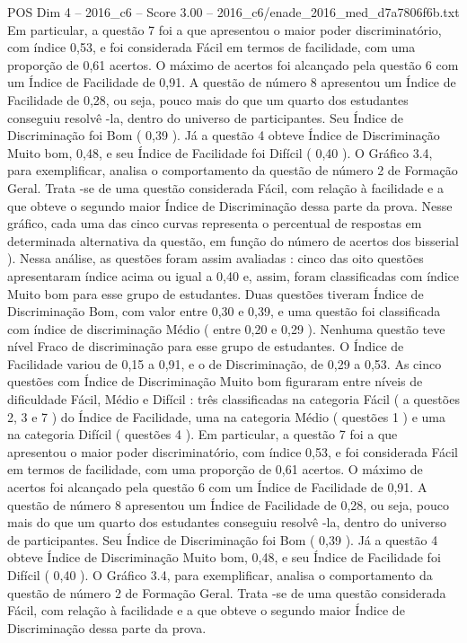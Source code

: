 \begin{textsample}{POS Dim 4 – 2016\_c6 – Score 3.00 – 2016\_c6/enade\_2016\_med\_d7a7806f6b.txt}
Em particular, a questão 7 foi a que apresentou o maior poder discriminatório, com índice 0,53, e foi considerada Fácil em termos de facilidade, com uma proporção de 0,61 acertos.
O máximo de acertos foi alcançado pela questão 6 com um Índice de Facilidade de 0,91.
A questão de número 8 apresentou um Índice de Facilidade de 0,28, ou seja, pouco mais do que um quarto dos estudantes conseguiu resolvê -la, dentro do universo de participantes.
Seu Índice de Discriminação foi Bom ( 0,39 ).
Já a questão 4 obteve Índice de Discriminação Muito bom, 0,48, e seu Índice de Facilidade foi Difícil ( 0,40 ).
O Gráfico 3.4, para exemplificar, analisa o comportamento da questão de número 2 de Formação Geral.
Trata -se de uma questão considerada Fácil, com relação à facilidade e a que obteve o segundo maior Índice de Discriminação dessa parte da prova.
Nesse gráfico, cada uma das cinco curvas representa o percentual de respostas em determinada alternativa da questão, em função do número de acertos dos bisserial ).
Nessa análise, as questões foram assim avaliadas : cinco das oito questões apresentaram índice acima ou igual a 0,40 e, assim, foram classificadas com índice Muito bom para esse grupo de estudantes.
Duas questões tiveram Índice de Discriminação Bom, com valor entre 0,30 e 0,39, e uma questão foi classificada com índice de discriminação Médio ( entre 0,20 e 0,29 ).
Nenhuma questão teve nível Fraco de discriminação para esse grupo de estudantes.
O Índice de Facilidade variou de 0,15 a 0,91, e o de Discriminação, de 0,29 a 0,53.
As cinco questões com Índice de Discriminação Muito bom figuraram entre níveis de dificuldade Fácil, Médio e Difícil : três classificadas na categoria Fácil ( a questões 2, 3 e 7 ) do Índice de Facilidade, uma na categoria Médio ( questões 1 ) e uma na categoria Difícil ( questões 4 ).
Em particular, a questão 7 foi a que apresentou o maior poder discriminatório, com índice 0,53, e foi considerada Fácil em termos de facilidade, com uma proporção de 0,61 acertos.
O máximo de acertos foi alcançado pela questão 6 com um Índice de Facilidade de 0,91.
A questão de número 8 apresentou um Índice de Facilidade de 0,28, ou seja, pouco mais do que um quarto dos estudantes conseguiu resolvê -la, dentro do universo de participantes.
Seu Índice de Discriminação foi Bom ( 0,39 ).
Já a questão 4 obteve Índice de Discriminação Muito bom, 0,48, e seu Índice de Facilidade foi Difícil ( 0,40 ).
O Gráfico 3.4, para exemplificar, analisa o comportamento da questão de número 2 de Formação Geral.
Trata -se de uma questão considerada Fácil, com relação à facilidade e a que obteve o segundo maior Índice de Discriminação dessa parte da prova.

\end{textsample}
